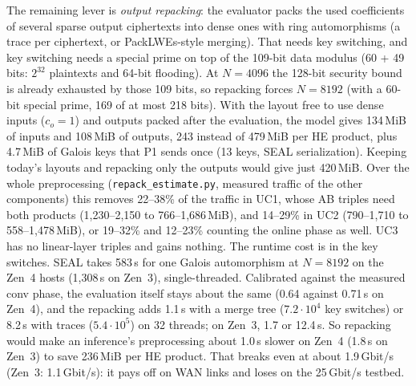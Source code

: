 The remaining lever is \emph{output repacking}: the evaluator packs the used coefficients of several sparse output
ciphertexts into dense ones with ring automorphisms (a trace per ciphertext, or PackLWEs-style merging). That needs key
switching, and key switching needs a special prime on top of the 109-bit data modulus (60 + 49 bits: $2^{32}$ plaintexts
and 64-bit flooding). At $N = 4096$ the 128-bit security bound is already exhausted by those 109 bits, so repacking
forces $N = 8192$ (with a 60-bit special prime, 169 of at most 218 bits). With the layout free to use dense inputs
($c_o = 1$) and outputs packed after the evaluation, the model gives 134\,MiB of inputs and 108\,MiB of outputs,
243 instead of 479\,MiB per HE product, plus 4.7\,MiB of Galois keys that P1 sends once (13 keys, SEAL serialization).
Keeping today's layouts and repacking only the outputs would give just 420\,MiB. Over the whole preprocessing
(\texttt{repack\_estimate.py}, measured traffic of the other components) this removes 22--38\% of the traffic in UC1,
whose AB triples need both products (1,230--2,150 to 766--1,686\,MiB), and 14--29\% in UC2 (790--1,710 to
558--1,478\,MiB), or 19--32\% and 12--23\% counting the online phase as well. UC3 has no linear-layer triples and
gains nothing. The runtime cost is in the key switches. SEAL takes 583\,\textmu s for one Galois automorphism at
$N = 8192$ on the Zen~4 hosts (1,308\,\textmu s on Zen~3), single-threaded. Calibrated against the measured conv
phase, the evaluation itself stays about the same (0.64 against 0.71\,s on Zen~4), and the repacking adds 1.1\,s with a
merge tree ($7.2\cdot10^4$ key switches) or 8.2\,s with traces ($5.4\cdot10^5$) on 32 threads; on Zen~3, 1.7 or
12.4\,s. So repacking would make an inference's preprocessing about 1.0\,s slower on Zen~4 (1.8\,s on Zen~3) to save
236\,MiB per HE product. That breaks even at about 1.9\,Gbit/s (Zen~3: 1.1\,Gbit/s): it pays off on WAN links and
loses on the 25\,Gbit/s testbed.

